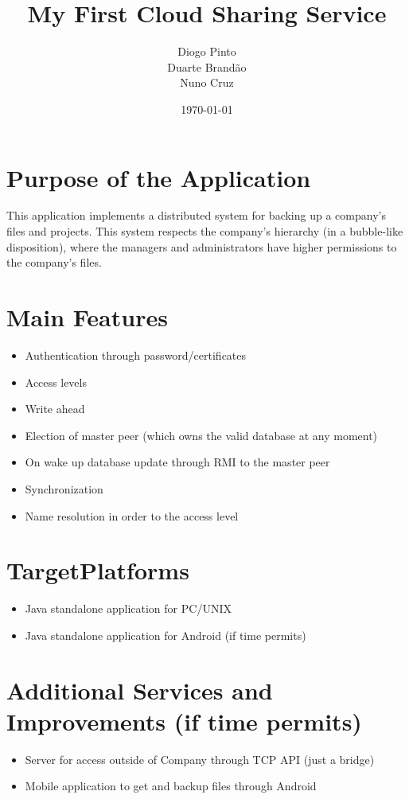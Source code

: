\documentclass[a4paper]{article}
\title{My First Cloud Sharing Service}
\author{Diogo Pinto \\ Duarte Brandão \\ Nuno Cruz}
\date{\today}
\begin{document}
\maketitle

\section{Purpose of the Application}


This application implements a distributed system for backing up a company's files and projects. This system respects the company's hierarchy (in a bubble-like disposition), where the managers and administrators have higher permissions to the company's files. 

\section{Main Features}

\begin{itemize}
\item Authentication through password/certificates
\item Access levels
\item Write ahead
\item Election of master peer (which owns the valid database at any moment)
\item On wake up database update through RMI to the master peer
\item Synchronization
\item Name resolution in order to the access level
\end{itemize}

\section{TargetPlatforms}
\begin{itemize}
\item Java standalone application for PC/UNIX
\item Java standalone application for Android (if time permits)
\end{itemize}
 
\section{Additional Services and Improvements (if time permits)}
\begin{itemize}
\item Server for access outside of Company through TCP API (just a bridge)
\item Mobile application to get and backup files through Android
\end{itemize}
\end{document}
